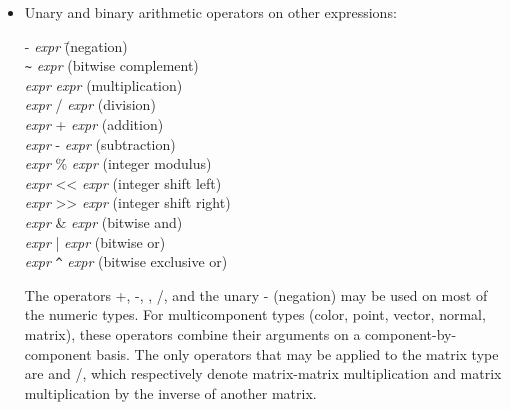\documentclass[11pt,letterpaper]{book}
\def\color{{\cf color}\xspace}
\def\matrix{{\cf matrix}\xspace}
\def\normal{{\cf normal}\xspace}
\def\point{{\cf point}\xspace}
\def\vector{{\cf vector}\xspace}
\begin{document}
\begin{itemize}
\item Unary and binary arithmetic operators on other expressions:

\begin{tabbing}
\hspace{0.25in} {\cf -} \emph{expr} \hspace{1in} \= (negation) \\
\hspace{0.25in} \verb|~| \emph{expr} \> (bitwise complement) \\
\hspace{0.25in} \emph{expr} {\cf *} \emph{expr} \> (multiplication) \\
\hspace{0.25in} \emph{expr} {\cf /} \emph{expr} \> (division) \\
\hspace{0.25in} \emph{expr} {\cf +} \emph{expr} \> (addition) \\
\hspace{0.25in} \emph{expr} {\cf -} \emph{expr} \> (subtraction) \\
\hspace{0.25in} \emph{expr} {\cf \%} \emph{expr} \> (integer modulus) \\
\hspace{0.25in} \emph{expr} {\cf <<} \emph{expr} \> (integer shift left) \\
\hspace{0.25in} \emph{expr} {\cf >>} \emph{expr} \> (integer shift right) \\
\hspace{0.25in} \emph{expr} {\cf \&} \emph{expr} \> (bitwise and) \\
\hspace{0.25in} \emph{expr} {\cf |} \emph{expr} \> (bitwise or) \\
\hspace{0.25in} \emph{expr} \verb|^| \emph{expr} \> (bitwise exclusive or) \\
\end{tabbing}

The operators {\cf +}, {\cf -}, {\cf *}, {\cf /}, and the unary {\cf -}
(negation) may be used on most of the numeric types.  For multicomponent
types (\color, \point, \vector, \normal, \matrix), these operators
combine their arguments on a component-by-component basis.
The only operators that may be applied to the \matrix type are
{\cf *} and {\cf /}, which respectively denote matrix-matrix
multiplication and matrix multiplication by the inverse of another
matrix.


\end{itemize}
\end{document}
